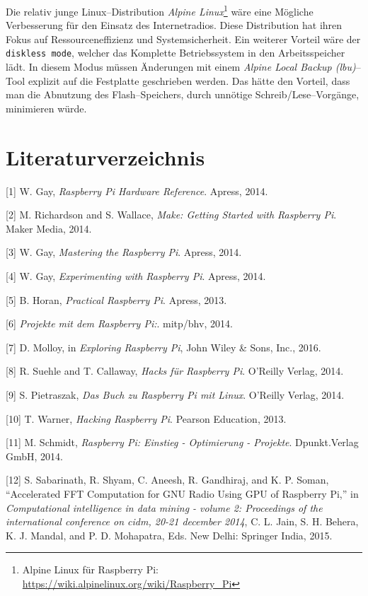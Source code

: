 \documentclass[11pt,ngerman,toc=listof,index=totoc]{scrreprt}
\begin{document}
Die relativ junge Linux--Distribution \emph{Alpine Linux}\footnote{Alpine
  Linux für Raspberry Pi:
  \url{https://wiki.alpinelinux.org/wiki/Raspberry_Pi}} wäre eine
Mögliche Verbesserung für den Einsatz des Internetradios. Diese
Distribution hat ihren Fokus auf Ressourceneffizienz und
Systemsicherheit. Ein weiterer Vorteil wäre der \texttt{diskless\ mode},
welcher das Komplette Betriebssystem in den Arbeitsspeicher lädt. In
diesem Modus müssen Änderungen mit einem \emph{Alpine Local Backup
(lbu)}--Tool explizit auf die Festplatte geschrieben werden. Das hätte
den Vorteil, dass man die Abnutzung des Flash--Speichers, durch unnötige
Schreib/Lese--Vorgänge, minimieren würde.

\chapter*{Literaturverzeichnis}\label{literaturverzeichnis}

\hypertarget{refs}{}
\hypertarget{ref-gay2014raspberry}{}
{[}1{]} W. Gay, \emph{Raspberry Pi Hardware Reference}. Apress, 2014.

\hypertarget{ref-richardson2014make}{}
{[}2{]} M. Richardson and S. Wallace, \emph{Make: Getting Started with
Raspberry Pi}. Maker Media, 2014.

\hypertarget{ref-gay2014mastering}{}
{[}3{]} W. Gay, \emph{Mastering the Raspberry Pi}. Apress, 2014.

\hypertarget{ref-gay2014experimenting}{}
{[}4{]} W. Gay, \emph{Experimenting with Raspberry Pi}. Apress, 2014.

\hypertarget{ref-horan2013practical}{}
{[}5{]} B. Horan, \emph{Practical Raspberry Pi}. Apress, 2013.

\hypertarget{ref-2014projekte}{}
{[}6{]} \emph{Projekte mit dem Raspberry Pi:}. mitp/bhv, 2014.

\hypertarget{ref-exploring}{}
{[}7{]} D. Molloy, in \emph{Exploring Raspberry Pi}, John Wiley \& Sons,
Inc., 2016.

\hypertarget{ref-suehle2014hacks}{}
{[}8{]} R. Suehle and T. Callaway, \emph{Hacks für Raspberry Pi}.
O'Reilly Verlag, 2014.

\hypertarget{ref-pietraszak2014buch}{}
{[}9{]} S. Pietraszak, \emph{Das Buch zu Raspberry Pi mit Linux}.
O'Reilly Verlag, 2014.

\hypertarget{ref-warner2013hacking}{}
{[}10{]} T. Warner, \emph{Hacking Raspberry Pi}. Pearson Education,
2013.

\hypertarget{ref-schmidt2014raspberry}{}
{[}11{]} M. Schmidt, \emph{Raspberry Pi: Einstieg - Optimierung -
Projekte}. Dpunkt.Verlag GmbH, 2014.

\hypertarget{ref-Sabarinath2015}{}
{[}12{]} S. Sabarinath, R. Shyam, C. Aneesh, R. Gandhiraj, and K. P.
Soman, ``Accelerated FFT Computation for GNU Radio Using GPU of
Raspberry Pi,'' in \emph{Computational intelligence in data mining -
volume 2: Proceedings of the international conference on cidm, 20-21
december 2014}, C. L. Jain, S. H. Behera, K. J. Mandal, and P. D.
Mohapatra, Eds. New Delhi: Springer India, 2015.
\end{document}
